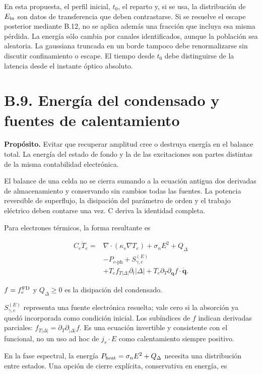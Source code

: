 \documentclass[
  spanish,
  10pt,
  a4paper,
]{article}
\begin{document}
En esta propuesta, el perfil inicial, \(t_0\), el reparto y, si se usa,
la distribución de \(E_{\rm in}\) son datos de transferencia que deben
contrastarse. Si se resuelve el escape posterior mediante B.12, no se
aplica además una fracción que incluya esa misma pérdida. La energía
sólo cambia por canales identificados, aunque la población sea
aleatoria. La gaussiana truncada en un borde tampoco debe renormalizarse
sin discutir confinamiento o escape. El tiempo desde \(t_0\) debe
distinguirse de la latencia desde el instante óptico absoluto.

\section{B.9. Energía del condensado y fuentes de
calentamiento}\label{b.9.-energuxeda-del-condensado-y-fuentes-de-calentamiento}

\textbf{Propósito.} Evitar que recuperar amplitud cree o destruya
energía en el balance total. La energía del estado de fondo y la de las
excitaciones son partes distintas de la misma contabilidad electrónica.

El balance de una celda no se cierra sumando a la ecuación antigua dos
derivadas de almacenamiento y conservando sin cambios todas las fuentes.
La potencia reversible de superflujo, la disipación del parámetro de
orden y el trabajo eléctrico deben contarse una vez. C deriva la
identidad completa.

Para electrones térmicos, la forma resultante es

\[
\begin{aligned}
C_e\dot T_e={}&\nabla\cdot(\kappa_s\nabla T_e)
+\sigma_nE^2+Q_\Delta\\
&-P_{e\text{-ph}}+S_{\gamma,e}^{(E)}\\
&+T_e f_{T|\Delta|}\partial_t|\Delta|+T_e\partial_T\partial_{\mathbf q}f\cdot\dot{\mathbf q}.
\end{aligned}
\tag{B.40}
\]

\(f=f_e^{\rm FD}\) y \(Q_\Delta\geq0\) es la disipación del condensado.

\(S_{\gamma,e}^{(E)}\) representa una fuente electrónica resuelta; vale
cero si la absorción ya quedó incorporada como condición inicial. Los
subíndices de \(f\) indican derivadas parciales:
\(f_{T|\Delta|}=\partial_T\partial_{|\Delta|}f\). Es una ecuación
invertible y consistente con el funcional, no un uso ad hoc de
\(j_s\cdot E\) como calentamiento siempre positivo.

En la fase espectral, la energía \(P_{\rm heat}=\sigma_nE^2+Q_\Delta\)
necesita una distribución entre estados. Una opción de cierre explícita,
conservativa en energía, es
\end{document}

